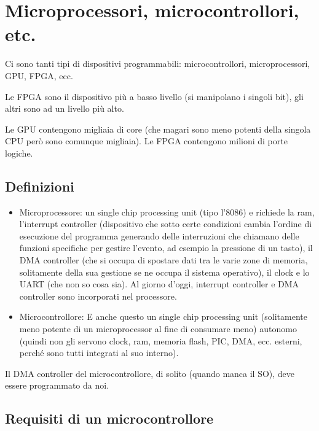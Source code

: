 \documentclass[
]{book}
\providecommand{\tightlist}{%
  \setlength{\itemsep}{0pt}\setlength{\parskip}{0pt}}
\begin{document}
\chapter{Microprocessori, microcontrollori,
etc.}\label{microprocessori-microcontrollori-etc.}

Ci sono tanti tipi di dispositivi programmabili: microcontrollori,
microprocessori, GPU, FPGA, ecc.

Le FPGA sono il dispositivo più a basso livello (si manipolano i singoli
bit), gli altri sono ad un livello più alto.

Le GPU contengono migliaia di core (che magari sono meno potenti della
singola CPU però sono comunque migliaia). Le FPGA contengono milioni di
porte logiche.

\section{Definizioni}\label{definizioni}

\begin{itemize}
\tightlist
\item
  Microprocessore: un single chip processing unit (tipo l'8086) e
  richiede la ram, l'interrupt controller (dispositivo che sotto certe
  condizioni cambia l'ordine di esecuzione del programma generando delle
  interruzioni che chiamano delle funzioni specifiche per gestire
  l'evento, ad esempio la pressione di un tasto), il DMA controller (che
  si occupa di spostare dati tra le varie zone di memoria, solitamente
  della sua gestione se ne occupa il sistema operativo), il clock e lo
  UART (che non so cosa sia). Al giorno d'oggi, interrupt controller e
  DMA controller sono incorporati nel processore.
\item
  Microcontrollore: E anche questo un single chip processing unit
  (solitamente meno potente di un microprocessor al fine di consumare
  meno) autonomo (quindi non gli servono clock, ram, memoria flash, PIC,
  DMA, ecc. esterni, perché sono tutti integrati al suo interno).
\end{itemize}

Il DMA controller del microcontrollore, di solito (quando manca il SO),
deve essere programmato da noi.

\section{Requisiti di un
microcontrollore}\label{requisiti-di-un-microcontrollore}
\end{document}
